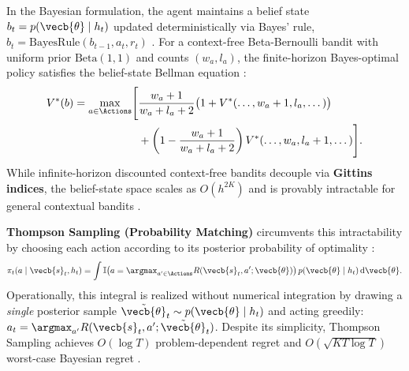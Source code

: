 \documentclass[../../../../master.tex]{subfiles}
\begin{document}
In the Bayesian formulation, the agent maintains a belief state $b_t = p(\vecb{\theta} \mid h_t)$ updated deterministically via Bayes' rule, $b_t = \mathrm{BayesRule}(b_{t-1}, a_t, r_t)$ . For a context-free Beta-Bernoulli bandit with uniform prior $\mathrm{Beta}(1,1)$ and counts $(w_a, l_a)$, the finite-horizon Bayes-optimal policy satisfies the belief-state Bellman equation :
\begin{equation}
\begin{aligned}
  V^*(b) = \max_{a \in \Actions} \Biggl[ &\frac{w_a+1}{w_a+l_a+2}\bigl(1 + V^*(\dots, w_a+1, l_a, \dots)\bigr) \\
  &+ \left(1 - \frac{w_a+1}{w_a+l_a+2}\right) V^*(\dots, w_a, l_a+1, \dots) \Biggr].
\end{aligned}
  \label{eq:bandit:gittins_dp}
\end{equation}
While infinite-horizon discounted context-free bandits decouple via \textbf{Gittins indices}, the belief-state space scales as $O(h^{2K})$ and is provably intractable for general contextual bandits .

\textbf{Thompson Sampling (Probability Matching)} circumvents this intractability by choosing each action according to its posterior probability of optimality :
\begin{equation}
  \pi_t(a \mid \vecb{s}_t, h_t) = \int \mathbb{I}\!\left(a = \argmax_{a' \in \Actions} R(\vecb{s}_t, a'; \vecb{\theta})\right) p(\vecb{\theta} \mid h_t)\, \mathrm{d}\vecb{\theta}.
  \label{eq:bandit:ts_integral}
\end{equation}
Operationally, this integral is realized without numerical integration by drawing a \emph{single} posterior sample $\tilde{\vecb{\theta}}_t \sim p(\vecb{\theta} \mid h_t)$ and acting greedily: $a_t = \argmax_{a'} R(\vecb{s}_t, a'; \tilde{\vecb{\theta}}_t)$. Despite its simplicity, Thompson Sampling achieves $O(\log T)$ problem-dependent regret and $O(\sqrt{KT\log T})$ worst-case Bayesian regret .

\end{document}
